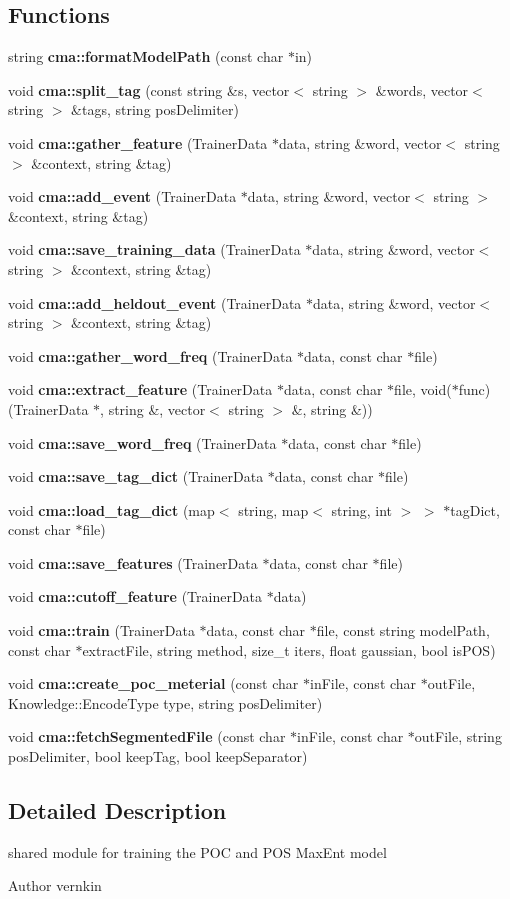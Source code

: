 \subsection*{Functions}
\begin{DoxyCompactItemize}
\item 
string {\bf cma::formatModelPath} (const char $\ast$in)
\item 
void {\bf cma::split\_\-tag} (const string \&s, vector$<$ string $>$ \&words, vector$<$ string $>$ \&tags, string posDelimiter)
\item 
void {\bf cma::gather\_\-feature} (TrainerData $\ast$data, string \&word, vector$<$ string $>$ \&context, string \&tag)
\item 
void {\bf cma::add\_\-event} (TrainerData $\ast$data, string \&word, vector$<$ string $>$ \&context, string \&tag)
\item 
void {\bf cma::save\_\-training\_\-data} (TrainerData $\ast$data, string \&word, vector$<$ string $>$ \&context, string \&tag)
\item 
void {\bf cma::add\_\-heldout\_\-event} (TrainerData $\ast$data, string \&word, vector$<$ string $>$ \&context, string \&tag)
\item 
void {\bf cma::gather\_\-word\_\-freq} (TrainerData $\ast$data, const char $\ast$file)
\item 
void {\bf cma::extract\_\-feature} (TrainerData $\ast$data, const char $\ast$file, void($\ast$func)(TrainerData $\ast$, string \&, vector$<$ string $>$ \&, string \&))
\item 
void {\bf cma::save\_\-word\_\-freq} (TrainerData $\ast$data, const char $\ast$file)
\item 
void {\bf cma::save\_\-tag\_\-dict} (TrainerData $\ast$data, const char $\ast$file)
\item 
void {\bf cma::load\_\-tag\_\-dict} (map$<$ string, map$<$ string, int $>$ $>$ $\ast$tagDict, const char $\ast$file)
\item 
void {\bf cma::save\_\-features} (TrainerData $\ast$data, const char $\ast$file)
\item 
void {\bf cma::cutoff\_\-feature} (TrainerData $\ast$data)
\item 
void {\bf cma::train} (TrainerData $\ast$data, const char $\ast$file, const string modelPath, const char $\ast$extractFile, string method, size\_\-t iters, float gaussian, bool isPOS)
\item 
void {\bf cma::create\_\-poc\_\-meterial} (const char $\ast$inFile, const char $\ast$outFile, Knowledge::EncodeType type, string posDelimiter)
\item 
void {\bf cma::fetchSegmentedFile} (const char $\ast$inFile, const char $\ast$outFile, string posDelimiter, bool keepTag, bool keepSeparator)
\end{DoxyCompactItemize}


\subsection{Detailed Description}
shared module for training the POC and POS MaxEnt model \begin{DoxyAuthor}{Author}
vernkin 
\end{DoxyAuthor}
